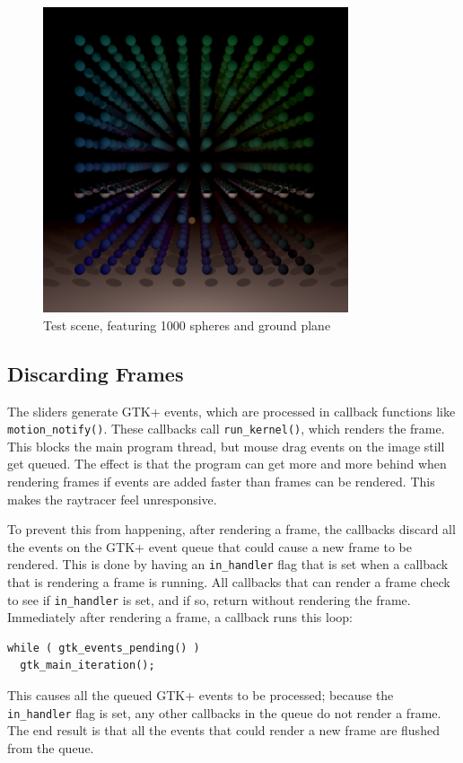 \documentclass{article}
\begin{document}
\begin{figure}[ht!]
\centering
\includegraphics[width=90mm]{scene.png}
\caption{Test scene, featuring 1000 spheres and ground plane}
\label{fig:testscene}
\end{figure}

\subsection{Discarding Frames}
The sliders generate GTK+ events, which are processed in callback functions like \texttt{motion\_notify()}. These callbacks call \texttt{run\_kernel()}, which renders the frame. This blocks the main program thread, but mouse drag events on the image still get queued. The effect is that the program can get more and more behind when rendering frames if events are added faster than frames can be rendered. This makes the raytracer feel unresponsive.

To prevent this from happening, after rendering a frame, the callbacks discard all the events on the GTK+ event queue that could cause a new frame to be rendered. This is done by having an \texttt{in\_handler} flag that is set when a callback that is rendering a frame is running. All callbacks that can render a frame check to see if \texttt{in\_handler} is set, and if so, return without rendering the frame. Immediately after rendering a frame, a callback runs this loop:

\begin{lstlisting}
while ( gtk_events_pending() )
  gtk_main_iteration();
\end{lstlisting}

This causes all the queued GTK+ events to be processed; because the \texttt{in\_handler} flag is set, any other callbacks in the queue do not render a frame. The end result is that all the events that could render a new frame are flushed from the queue.
\end{document}
